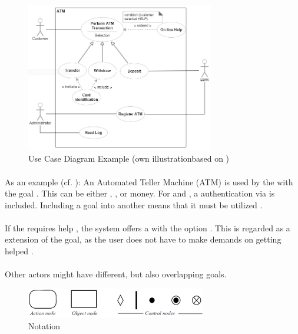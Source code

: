\begin{figure}[H]
    \centering
    \includegraphics[width=0.73\textwidth]{img/ucEx.png}
    \caption[Use Case Diagram Example]{Use Case Diagram Example (own illustrationbased on \cite[641-644]{ObjectManagementGroup.01.03.2015})}\label{fig:ucEx}
\end{figure}

\paragraph{} As an example (cf. ): An Automated Teller Machine (ATM) is used by the  with the goal . This can be either , , or  money. For  and , a authentication via  is included. Including a goal into another means that it must be utilized \parencite[cf.][639]{ObjectManagementGroup.01.03.2015}. 

\paragraph{} If the  requires help , the system offers a  with the option . This is regarded as a extension of the goal, as the user does not have to make demands on getting helped \parencite[cf.][638-639]{ObjectManagementGroup.01.03.2015}.

\paragraph{} 
Other actors might have different, but also overlapping goals.

\begin{figure}[H]
    \centering
    \includegraphics[width=0.7\textwidth]{img/ActivitySymbols.pdf}
    \caption{Notation}\label{fig:adSymb}
\end{figure}

